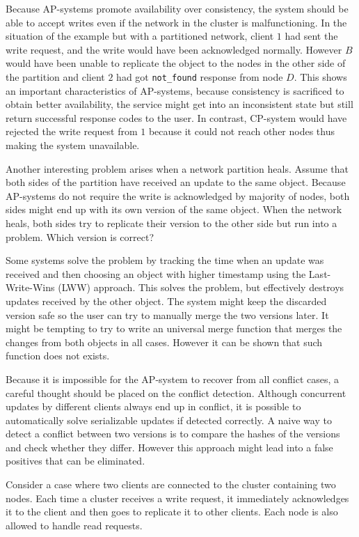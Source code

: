 Because AP-systems promote availability over consistency, the system should be
able to accept writes even if the network in the cluster is malfunctioning. In
the situation of the example but with a partitioned network, client \(1\) had
sent the write request, and the write would have been acknowledged normally.
However \(B\) would have been unable to replicate the object to the nodes in the
other side of the partition and client \(2\) had got \texttt{not\_found}
response from node \(D\). This shows an important characteristics of AP-systems,
because consistency is sacrificed to obtain better availability, the service
might get into an inconsistent state but still return successful response codes
to the user. In contrast, CP-system would have rejected the write request from
\(1\) because it could not reach other nodes thus making the system unavailable.

Another interesting problem arises when a network partition heals. Assume that
both sides of the partition have received an update to the same object. Because
AP-systems do not require the write is acknowledged by majority of nodes, both
sides might end up with its own version of the same object. When the network
heals, both sides try to replicate their version to the other side but run into
a problem. Which version is correct?

Some systems solve the problem by tracking the time when an update was received
and then choosing an object with higher timestamp using the Last-Write-Wins
(LWW) approach. This solves the problem, but effectively destroys updates
received by the other object. The system might keep the discarded version safe
so the user can try to manually merge the two versions later. It might be
tempting to try to write an universal merge function that merges the changes
from both objects in all cases. However it can be shown that such function does
not exists.

Because it is impossible for the AP-system to recover from all conflict cases, a
careful thought should be placed on the conflict detection. Although concurrent
updates by different clients always end up in conflict, it is possible to
automatically solve serializable updates if detected correctly. A naive way to
detect a conflict between two versions is to compare the hashes of the versions
and check whether they differ. However this approach might lead into a false
positives that can be eliminated.

Consider a case where two clients are connected to the cluster containing two
nodes. Each time a cluster receives a write request, it immediately acknowledges
it to the client and then goes to replicate it to other clients. Each node is
also allowed to handle read requests.

